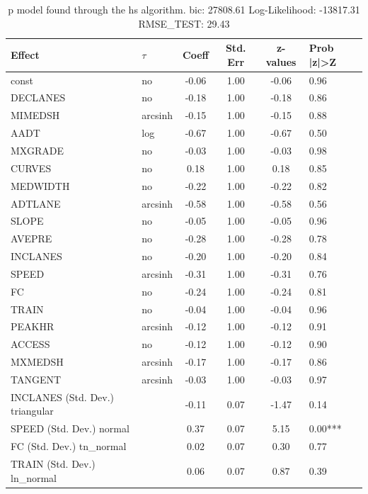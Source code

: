 \begin{table}
	\caption{p model found through the hs algorithm. bic: 27808.61 Log-Likelihood: -13817.31 RMSE_TEST: 29.43}
	\begin{center}
		\begin{tabular}{|l|l|c|c|c|l|}
			\hline
			Effect & $\tau$ & Coeff & Std. Err & z-values & Prob |z|>Z \\
			\hline
			const & no & -0.06 & 1.00 & -0.06 & 0.96 \\
			\hline
			DECLANES & no & -0.18 & 1.00 & -0.18 & 0.86 \\
			\hline
			MIMEDSH & arcsinh & -0.15 & 1.00 & -0.15 & 0.88 \\
			\hline
			AADT & log & -0.67 & 1.00 & -0.67 & 0.50 \\
			\hline
			MXGRADE & no & -0.03 & 1.00 & -0.03 & 0.98 \\
			\hline
			CURVES & no & 0.18 & 1.00 & 0.18 & 0.85 \\
			\hline
			MEDWIDTH & no & -0.22 & 1.00 & -0.22 & 0.82 \\
			\hline
			ADTLANE & arcsinh & -0.58 & 1.00 & -0.58 & 0.56 \\
			\hline
			SLOPE & no & -0.05 & 1.00 & -0.05 & 0.96 \\
			\hline
			AVEPRE & no & -0.28 & 1.00 & -0.28 & 0.78 \\
			\hline
			INCLANES & no & -0.20 & 1.00 & -0.20 & 0.84 \\
			\hline
			SPEED & arcsinh & -0.31 & 1.00 & -0.31 & 0.76 \\
			\hline
			FC & no & -0.24 & 1.00 & -0.24 & 0.81 \\
			\hline
			TRAIN & no & -0.04 & 1.00 & -0.04 & 0.96 \\
			\hline
			PEAKHR & arcsinh & -0.12 & 1.00 & -0.12 & 0.91 \\
			\hline
			ACCESS & no & -0.12 & 1.00 & -0.12 & 0.90 \\
			\hline
			MXMEDSH & arcsinh & -0.17 & 1.00 & -0.17 & 0.86 \\
			\hline
			TANGENT & arcsinh & -0.03 & 1.00 & -0.03 & 0.97 \\
			\hline
			INCLANES (Std. Dev.) triangular &  & -0.11 & 0.07 & -1.47 & 0.14 \\
			\hline
			SPEED (Std. Dev.) normal &  & 0.37 & 0.07 & 5.15 & 0.00*** \\
			\hline
			FC (Std. Dev.) tn_normal &  & 0.02 & 0.07 & 0.30 & 0.77 \\
			\hline
			TRAIN (Std. Dev.) ln_normal &  & 0.06 & 0.07 & 0.87 & 0.39 \\

\end{tabular}
\end{center}
\end{table}
